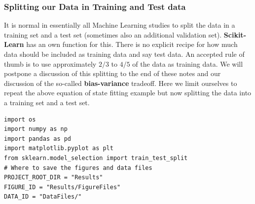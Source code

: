 \documentclass{beamer}
\begin{document}
\begin{frame}
\frametitle{Splitting our Data in Training and Test data}

It is normal in essentially all Machine Learning studies to split the
data in a training set and a test set (sometimes also an additional
validation set).  \textbf{Scikit-Learn} has an own function for this. There
is no explicit recipe for how much data should be included as training
data and say test data.  An accepted rule of thumb is to use
approximately $2/3$ to $4/5$ of the data as training data. We will
postpone a discussion of this splitting to the end of these notes and
our discussion of the so-called \textbf{bias-variance} tradeoff. Here we
limit ourselves to repeat the above equation of state fitting example
but now splitting the data into a training set and a test set.


































































\begin{verbatim}
import os
import numpy as np
import pandas as pd
import matplotlib.pyplot as plt
from sklearn.model_selection import train_test_split
# Where to save the figures and data files
PROJECT_ROOT_DIR = "Results"
FIGURE_ID = "Results/FigureFiles"
DATA_ID = "DataFiles/"


\end{verbatim}
\end{frame}
\end{document}
